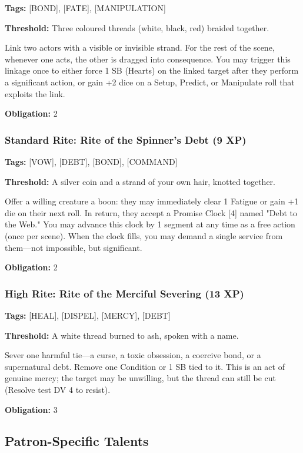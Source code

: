 \textbf{Tags:} [BOND], [FATE], [MANIPULATION]

\textbf{Threshold:} Three coloured threads (white, black, red) braided together.

Link two actors with a visible or invisible strand. For the rest of the scene, whenever one acts, the other is dragged into consequence. You may trigger this linkage once to either force 1 SB (Hearts) on the linked target after they perform a significant action, or gain +2 dice on a Setup, Predict, or Manipulate roll that exploits the link.

\textbf{Obligation:} 2

\subsubsection{Standard Rite: Rite of the Spinner's Debt (9 XP)}

\textbf{Tags:} [VOW], [DEBT], [BOND], [COMMAND]

\textbf{Threshold:} A silver coin and a strand of your own hair, knotted together.

Offer a willing creature a boon: they may immediately clear 1 Fatigue or gain +1 die on their next roll. In return, they accept a Promise Clock [4] named "Debt to the Web." You may advance this clock by 1 segment at any time as a free action (once per scene). When the clock fills, you may demand a single service from them—not impossible, but significant.

\textbf{Obligation:} 2

\subsubsection{High Rite: Rite of the Merciful Severing (13 XP)}

\textbf{Tags:} [HEAL], [DISPEL], [MERCY], [DEBT]

\textbf{Threshold:} A white thread burned to ash, spoken with a name.

Sever one harmful tie—a curse, a toxic obsession, a coercive bond, or a supernatural debt. Remove one Condition or 1 SB tied to it. This is an act of genuine mercy; the target may be unwilling, but the thread can still be cut (Resolve test DV 4 to resist).

\textbf{Obligation:} 3

\subsection{Patron-Specific Talents}

